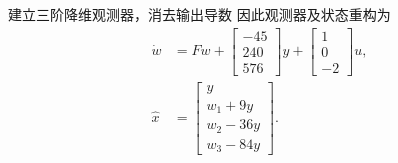 \documentclass[11pt]{article}
\begin{document}
\begin{solution}
\begin{proofstep}{建立三阶降维观测器，消去输出导数}
因此观测器及状态重构为
\[
 \boxed{\begin{aligned}
  \dot w&=Fw+\begin{bmatrix}-45\\240\\576\end{bmatrix}y
   +\begin{bmatrix}1\\0\\-2\end{bmatrix}u,\\
  \hat x&=\begin{bmatrix}y\\w_1+9y\\w_2-36y\\w_3-84y\end{bmatrix}.
 \end{aligned}}
\]
\end{proofstep}


\end{solution}
\end{document}
